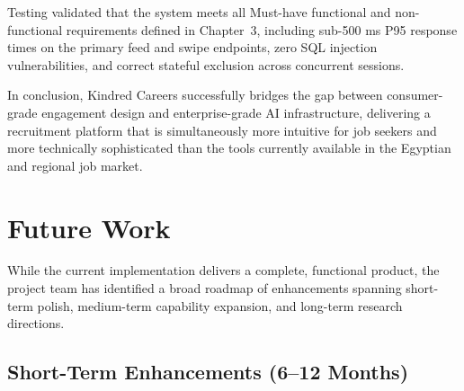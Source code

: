 \documentclass[12pt, a4paper, oneside]{report}
\begin{document}
\noindent Testing validated that the system meets all Must-have functional and non-functional
requirements defined in Chapter~3, including sub-500 ms P95 response times on the primary
feed and swipe endpoints, zero SQL injection vulnerabilities, and correct stateful exclusion
across concurrent sessions.

In conclusion, Kindred Careers successfully bridges the gap between consumer-grade
engagement design and enterprise-grade AI infrastructure, delivering a recruitment platform
that is simultaneously more intuitive for job seekers and more technically sophisticated
than the tools currently available in the Egyptian and regional job market.

\section{Future Work}
\label{sec:future-work}

While the current implementation delivers a complete, functional product, the project team
has identified a broad roadmap of enhancements spanning short-term polish, medium-term
capability expansion, and long-term research directions.

\subsection{Short-Term Enhancements (6--12 Months)}
\label{sec:future-short}
\end{document}

